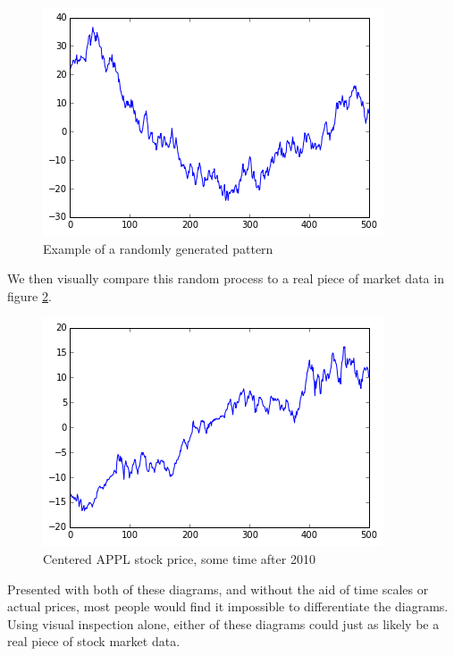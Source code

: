 \documentclass{report}
\begin{document}
\begin{figure}[H]
	\caption{Example of a randomly generated pattern}
	\centerline{\includegraphics[width=\textwidth]{vis/random-process.png}}
	\label{fig:random-process}
\end{figure}

We then visually compare this random process to a real piece of market data in figure \ref{fig:appl-process}.

\begin{figure}[H]
	\caption{Centered APPL stock price, some time after 2010}
	\centerline{\includegraphics[width=\textwidth]{vis/appl.png}}
	\label{fig:appl-process}
\end{figure}

Presented with both of these diagrams, and without the aid of time scales or actual prices, most people would find it impossible to differentiate the diagrams. Using visual inspection alone, either of these diagrams could just as likely be a real piece of stock market data.
\end{document}
